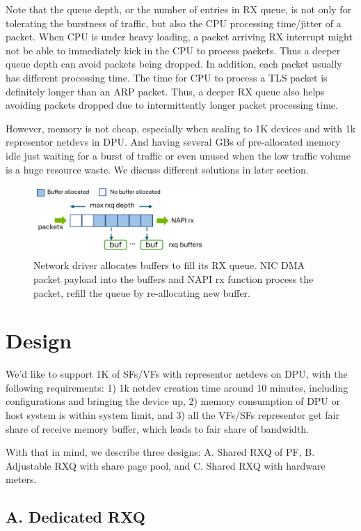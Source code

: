 \documentclass[letterpaper]{article}
\begin{document}
Note that the queue depth, or the number of entries in RX queue, is
not only for tolerating the burstness of traffic, but also the CPU
processing time/jitter of a packet. When CPU is under heavy loading,
a packet arriving RX interrupt might not be able to immediately
kick in the CPU to process packets. Thus a deeper queue depth can
avoid packets being dropped.
In addition, each packet usually has different processing time.
The time for CPU to process a TLS packet is definitely longer than
an ARP packet. Thus, a deeper RX queue also helps avoiding packets
dropped due to intermittently longer packet processing time.

However, memory is not cheap, especially when scaling to 1K devices
and with 1k representor netdevs in DPU. And having several GBs of
pre-allocated memory idle just waiting for a burst of traffic
or even unused when the low traffic volume is a huge resource waste.
We discuss different solutions in later section.

\begin{figure}[t!]
\includegraphics[width=2.6in]{rxq.pdf}
\centering
\caption{Network driver allocates buffers to fill its RX queue. NIC DMA packet
payload into the buffers and NAPI rx function process the packet, refill the 
queue by re-allocating new buffer.}
\label{fig:rxq}
\end{figure}

\section{Design}
We'd like to support 1K of SFs/VFs with representor netdevs
on DPU, with the following requirements: 1) 1k netdev creation time
around 10 minutes, including configurations and bringing the device up,
2) memory consumption of DPU or host system is within
system limit, and 3) all the VFs/SFs representor get fair share
of receive memory buffer, which leads to fair share of bandwidth.

With that in mind, we describe three designs: A. Shared RXQ of PF,
B. Adjustable RXQ with share page pool, and C. Shared RXQ with hardware meters.

\subsection{A. Dedicated RXQ}
\end{document}
